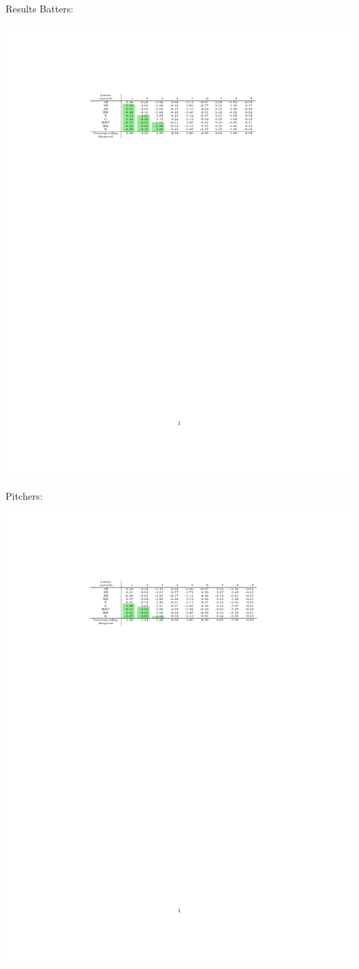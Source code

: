 \documentclass[handout]{beamer}
\begin{document}
\begin{frame}{Results}
Batters:
\begin{center}
\includegraphics[width = .8\textwidth]{figures/B_bat_fancy.pdf}\\
\end{center}
Pitchers:
\begin{center}
\includegraphics[width = .8\textwidth]{figures/B_pit_fancy.pdf}
\end{center}
\end{frame}
\end{document}
